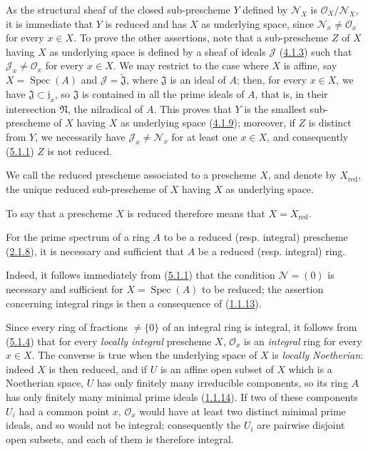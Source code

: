 As the structural sheaf of the closed sub-prescheme $Y$ defined by
$\mathscr{N}_X$ is $\mathscr{O}_X/\mathscr{N}_X$, it is immediate that $Y$
is reduced and has $X$ as underlying space, since
$\mathscr{N}_x\ne\mathscr{O}_x$ for every $x\in X$. To prove the other
assertions, note that a sub-prescheme $Z$ of $X$ having $X$ as underlying
space is defined by a sheaf of ideals $\mathscr{J}$
(\hyperref[I.4.1.3]{4.1.3}) such that
$\mathscr{J}_x\ne\mathscr{O}_x$ for every $x\in X$. We may restrict to the case
where $X$ is affine, say $X=\operatorname{Spec}(A)$ and
$\mathscr{J}=\widetilde{\mathfrak{J}}$, where $\mathfrak{J}$ is an ideal of
$A$; then, for every $x\in X$, we have
$\mathfrak{J}\subset\mathfrak{j}_x$, so $\mathfrak{J}$ is contained in
all the prime ideals of $A$, that is, in their intersection
$\mathfrak{N}$, the nilradical of $A$. This proves that $Y$ is the smallest
sub-prescheme of $X$ having $X$ as underlying space
(\hyperref[I.4.1.9]{4.1.9}); moreover, if $Z$ is distinct from $Y$, we
necessarily have $\mathscr{J}_x\ne\mathscr{N}_x$ for at least one $x\in X$,
and consequently (\hyperref[I.5.1.1]{5.1.1}) $Z$ is not reduced.

\begin{definition}[5.1.3]
\label{I.5.1.3}
We call the reduced prescheme associated to a prescheme $X$, and denote by
$X_{\mathrm{red}}$, the unique reduced sub-prescheme of $X$ having $X$ as
underlying space.
\end{definition}

To say that a prescheme $X$ is reduced therefore means that
$X=X_{\mathrm{red}}$.

\begin{proposition}[5.1.4]
\label{I.5.1.4}
For the prime spectrum of a ring $A$ to be a reduced (resp.
integral) prescheme (\hyperref[I.2.1.8]{2.1.8}), it is necessary and
sufficient that $A$ be a reduced (resp. integral) ring.
\end{proposition}

Indeed, it follows immediately from (\hyperref[I.5.1.1]{5.1.1}) that the
condition $\mathscr{N}=(0)$ is necessary and sufficient for
$X=\operatorname{Spec}(A)$ to be reduced; the assertion concerning integral
rings is then a consequence of
(\hyperref[I.1.1.13]{1.1.13}).

Since every ring of fractions $\ne\{0\}$ of an integral ring is integral, it
follows from (\hyperref[I.5.1.4]{5.1.4}) that for every \emph{locally
integral} prescheme $X$, $\mathscr{O}_x$ is an \emph{integral} ring
for every $x\in X$. The converse is true when the underlying space of
$X$ is \emph{locally Noetherian}: indeed $X$ is then reduced, and if
$U$ is an affine open subset of $X$ which is a Noetherian space, $U$ has only
finitely many irreducible components, so its ring $A$ has only
finitely many minimal prime ideals
(\hyperref[I.1.1.14]{1.1.14}). If two of these components $U_i$ had a
common point $x$, $\mathscr{O}_x$ would have at least two distinct minimal
prime ideals, and so would not be integral; consequently the $U_i$ are
pairwise disjoint open subsets, and each of them is therefore integral.

